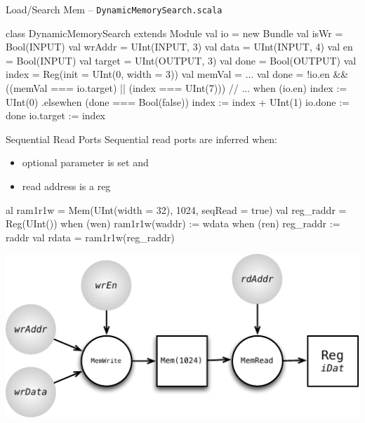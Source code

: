 \documentclass[xcolor=pdflatex,dvipsnames,table]{beamer}
\begin{document}
\begin{frame}[fragile]{Load/Search Mem -- \tt DynamicMemorySearch.scala}
\begin{scala}
class DynamicMemorySearch extends Module {
  val io = new Bundle {
    val isWr   = Bool(INPUT)
    val wrAddr = UInt(INPUT, 3)
    val data   = UInt(INPUT, 4)
    val en     = Bool(INPUT)
    val target = UInt(OUTPUT, 3)
    val done   = Bool(OUTPUT)
  }
  val index  = Reg(init = UInt(0, width = 3))
  val memVal = ...
  val done = !io.en && ((memVal === io.target) || (index === UInt(7)))
  // ...
  when (io.en) {
    index := UInt(0)
  } .elsewhen (done === Bool(false)) {
    index := index + UInt(1)
  }
  io.done   := done
  io.target := index
}
\end{scala}
\end{frame}

\begin{frame}[fragile]{Sequential Read Ports}
Sequential read ports are inferred when:
\begin{itemize}
\item optional parameter  is set and
\item read address is a reg
\end{itemize}

\begin{scala}
al ram1r1w =
  Mem(UInt(width = 32), 1024, seqRead = true)
val reg_raddr = Reg(UInt())
when (wen) { ram1r1w(waddr) := wdata }
when (ren) { reg_raddr := raddr }
val rdata = ram1r1w(reg_raddr)
\end{scala}

\begin{center}
\includegraphics[height=0.4\textheight]{../cs250/figs/mem-seq-read.pdf} 
\end{center}

\end{frame}
\end{document}
